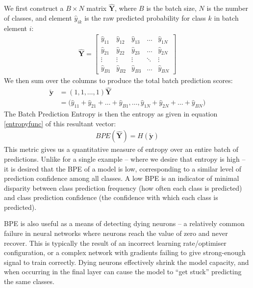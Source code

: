 \documentclass{report}
\begin{document}
We first construct a $B{\times}N$ matrix $\bm{\hat{Y}}$, where $B$ is the batch size, $N$ is the number of classes, and element $\hat{y}_{ik}$ is the raw predicted probability for class $k$ in batch element $i$:
\begin{align} \label{eq:bpe:1}
\bm{\hat{Y}} = \begin{bmatrix}
\hat{y}_{11} & \hat{y}_{12} & \hat{y}_{13} & \dots  & \hat{y}_{1N} \\
\hat{y}_{21} & \hat{y}_{22} & \hat{y}_{23} & \dots  & \hat{y}_{2N} \\
\vdots & \vdots & \vdots & \ddots & \vdots \\
\hat{y}_{B1} & \hat{y}_{B2} & \hat{y}_{B3} & \dots  & \hat{y}_{BN}
\end{bmatrix}
\end{align}
We then sum over the columns to produce the total batch prediction scores:
\begin{align} \label{eq:bpe:2}
\bm{\tilde{y}} &= (1, 1, \dots, 1)\bm{\hat{Y}} \\
  &= \big(\hat{y}_{11} + \hat{y}_{21} + \dots + \hat{y}_{B1}, \dots, \hat{y}_{1N} + \hat{y}_{2N} + \dots + \hat{y}_{BN}\big)
\end{align}
The Batch Prediction Entropy is then the entropy as given in equation \ref{entropyfunc} of this resultant vector:
\begin{align}
BPE(\bm{\hat{Y}}) = H(\bm{\tilde{y}})
\end{align}
This metric gives us a quantitative measure of entropy over an entire batch of predictions. Unlike for a single example -- where we desire that entropy is high -- it is desired that the BPE of a model is low, corresponding to a similar level of prediction confidence among all classes. A low BPE is an indicator of minimal disparity between class prediction frequency (how often each class is predicted) and class prediction confidence (the confidence with which each class is predicted). \par
BPE is also useful as a means of detecting dying neurons -- a relatively common failure in neural networks where neurons reach the value of zero and never recover. This is typically the result of an incorrect learning rate/optimiser configuration, or a complex network with gradients failing to give strong-enough signal to train correctly. Dying neurons effectively shrink the model capacity, and when occurring in the final layer can cause the model to ``get stuck'' predicting the same classes. \par
\end{document}
